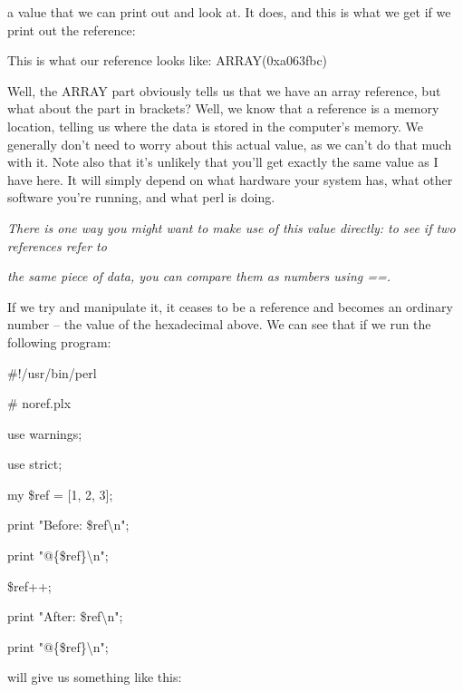 \documentclass[a4paper,11pt]{book}
\begin{document}
\noindent a value that we can print out and look at. It does, and this is what we get if we print out the reference:

\noindent 

\noindent This is what our reference looks like: ARRAY(0xa063fbc)

\noindent 

\noindent Well, the ARRAY part obviously tells us that we have an array reference, but what about the part in brackets? Well, we know that a reference is a memory location, telling us where the data is stored in the computer's memory. We generally don't need to worry about this actual value, as we can't do that much with it. Note also that it's unlikely that you'll get exactly the same value as I have here. It will simply depend on what hardware your system has, what other software you're running, and what perl is doing.

\noindent 

\noindent \textit{There is one way you might want to make use of this value directly: to see if two references refer to}

\noindent \textit{the same piece of data, you can compare them as numbers using ==.}

\noindent 

\noindent If we try and manipulate it, it ceases to be a reference and becomes an ordinary number -- the value of the hexadecimal above. We can see that if we run the following program:

\noindent 

\noindent \#!/usr/bin/perl

\noindent \# noref.plx

\noindent use warnings;

\noindent use strict;

\noindent 

\noindent my \$ref = [1, 2, 3];

\noindent print "Before: \$ref\textbackslash n";

\noindent print "@\{\$ref\}\textbackslash n";

\noindent \$ref++;

\noindent print "After: \$ref\textbackslash n";

\noindent print "@\{\$ref\}\textbackslash n";

\noindent 

\noindent 

\noindent will give us something like this:

\noindent 
\end{document}
